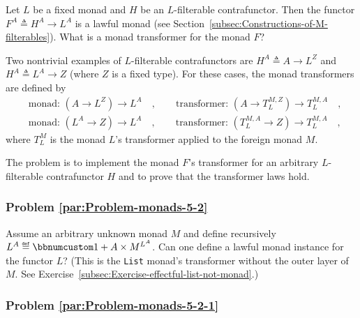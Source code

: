 Let $L$ be a fixed monad and $H$ be an $L$-filterable contrafunctor.
Then the functor $F^{A}\triangleq H^{A}\rightarrow L^{A}$ is a lawful
monad (see Section~\ref{subsec:Constructions-of-M-filterables}).
What is a monad transformer for the monad $F$? 

Two nontrivial examples of $L$-filterable contrafunctors are $H^{A}\triangleq A\rightarrow L^{Z}$
and $H^{A}\triangleq L^{A}\rightarrow Z$ (where $Z$ is a fixed type).
For these cases, the monad transformers are defined by
\begin{align*}
 & \text{monad: }(A\rightarrow L^{Z})\rightarrow L^{A}\quad,\quad\quad\text{transformer: }(A\rightarrow T_{L}^{M,Z})\rightarrow T_{L}^{M,A}\quad,\\
 & \text{monad: }(L^{A}\rightarrow Z)\rightarrow L^{A}\quad,\quad\quad\text{transformer: }(T_{L}^{M,A}\rightarrow Z)\rightarrow T_{L}^{M,A}\quad,
\end{align*}
where $T_{L}^{M}$ is the monad $L$\textsf{'}s transformer applied to the
foreign monad $M$.

The problem is to implement the monad $F$\textsf{'}s transformer for an arbitrary
$L$-filterable contrafunctor $H$ and to prove that the transformer
laws hold.

\subsubsection{Problem \label{par:Problem-monads-5-2}\ref{par:Problem-monads-5-2}}

Assume an arbitrary unknown monad $M$ and define recursively $L^{A}\triangleq\bbnum 1+A\times M^{L^{A}}$.
Can one define a lawful monad instance for the functor $L$? (This
is the \lstinline!List! monad\textsf{'}s transformer without the outer layer
of $M$. See Exercise~\ref{subsec:Exercise-effectful-list-not-monad}.)

\subsubsection{Problem \label{par:Problem-monads-5-2-1}\ref{par:Problem-monads-5-2-1}}

